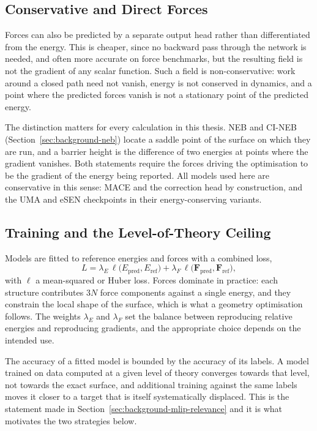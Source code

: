 \subsection{Conservative and Direct Forces}
\label{sec:mlip-conservative}
 
Forces can also be predicted by a separate output head rather than differentiated from
the energy. This is cheaper, since no backward pass through the network is needed, and
often more accurate on force benchmarks, but the resulting field is not the gradient of
any scalar function. Such a field is non-conservative: work around a closed path need
not vanish, energy is not conserved in dynamics, and a point where the predicted forces
vanish is not a stationary point of the predicted energy.
 
The distinction matters for every calculation in this thesis. NEB and CI-NEB
(Section~\ref{sec:background-neb}) locate a saddle point of the surface on which they
are run, and a barrier height is the difference of two energies at points where the
gradient vanishes. Both statements require the forces driving the optimisation to be
the gradient of the energy being reported. All models used here are conservative in
this sense: MACE and the correction head by construction, and the UMA and eSEN
checkpoints in their energy-conserving variants.
 
\subsection{Training and the Level-of-Theory Ceiling}
\label{sec:mlip-training}
 
Models are fitted to reference energies and forces with a combined loss,
%
\begin{equation}
  L = \lambda_E \, \ell\big(E_{\text{pred}}, E_{\text{ref}}\big)
    + \lambda_F \, \ell\big(\mathbf{F}_{\text{pred}}, \mathbf{F}_{\text{ref}}\big),
\end{equation}
%
with $\ell$ a mean-squared or Huber loss. Forces dominate in practice: each structure
contributes $3N$ force components against a single energy, and they constrain the local
shape of the surface, which is what a geometry optimisation follows. The weights
$\lambda_E$ and $\lambda_F$ set the balance between reproducing relative energies and
reproducing gradients, and the appropriate choice depends on the intended use.
 
The accuracy of a fitted model is bounded by the accuracy of its labels. A model
trained on data computed at a given level of theory converges towards that level, not
towards the exact surface, and additional training against the same labels moves it
closer to a target that is itself systematically displaced. This is the statement made
in Section~\ref{sec:background-mlip-relevance} and it is what motivates the two
strategies below.
 
